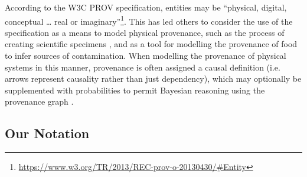 {}

{According to the W3C PROV specification, entities may be ``physical,
digital, conceptual \ldots{} real or imaginary''\footnote{\url{https://www.w3.org/TR/2013/REC-prov-o-20130430/\#Entity}}. This has led others to consider the use of
the specification as a means to model physical provenance, such as the
process of creating scientific specimens \cite{Cox2015}, and as a tool
for modelling the provenance of food \cite{Batlajery2018} to infer
sources of contamination. When modelling the provenance of physical
systems in this manner, provenance is often assigned a causal definition
(i.e. arrows represent causality rather than just dependency), which may
optionally be supplemented with probabilities to permit Bayesian
reasoning using the provenance graph \cite{Chapman2010}.}


\subsection{Our Notation}

\label{sec:ournotation}

